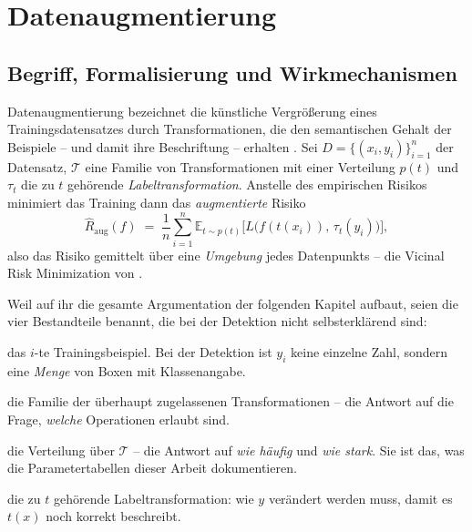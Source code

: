 \chapter{Datenaugmentierung}
\label{kap:augtheorie}

\section{Begriff, Formalisierung und Wirkmechanismen}
\label{sec:augformal}

Datenaugmentierung bezeichnet die künstliche Vergrößerung eines
Trainingsdatensatzes durch Transformationen, die den semantischen Gehalt der
Beispiele -- und damit ihre Beschriftung -- erhalten \parencite{shorten2019}. Sei
$D = \{(x_i, y_i)\}_{i=1}^{n}$ der Datensatz, $\mathcal{T}$ eine Familie von
Transformationen mit einer Verteilung $p(t)$ und $\tau_t$ die zu $t$ gehörende
\emph{Labeltransformation}. Anstelle des empirischen Risikos minimiert das
Training dann das \emph{augmentierte} Risiko
\begin{equation}
\hat{R}_{\text{aug}}(f) \;=\; \frac{1}{n}\sum_{i=1}^{n}
\mathbb{E}_{t \sim p(t)}\Big[ L\big(f(t(x_i)),\, \tau_t(y_i)\big) \Big],
\label{eq:erm-aug}
\end{equation}
also das Risiko gemittelt über eine \emph{Umgebung} jedes Datenpunkts --
die Vicinal Risk Minimization von \textcite{chapelle2001}.

 Weil auf ihr die gesamte Argumentation der
folgenden Kapitel aufbaut, seien die vier Bestandteile benannt, die bei der
Detektion nicht selbsterklärend sind:

\begin{description}[leftmargin=4.2em,style=sameline,itemsep=0pt,
                    font=\normalfont]
  \item[$(x_i, y_i)$] das $i$-te Trainingsbeispiel. Bei der Detektion ist $y_i$
  keine einzelne Zahl, sondern eine \emph{Menge} von Boxen mit Klassenangabe.
  \item[$\mathcal{T}$] die Familie der überhaupt zugelassenen Transformationen --
  die Antwort auf die Frage, \emph{welche} Operationen erlaubt sind.
  \item[$p(t)$] die Verteilung über $\mathcal{T}$ -- die Antwort auf
  \emph{wie häufig} und \emph{wie stark}. Sie ist das, was die
  Parametertabellen dieser Arbeit dokumentieren.
  \item[$\tau_t$] die zu $t$ gehörende Labeltransformation: wie $y$ verändert
  werden muss, damit es $t(x)$ noch korrekt beschreibt.
\end{description}

